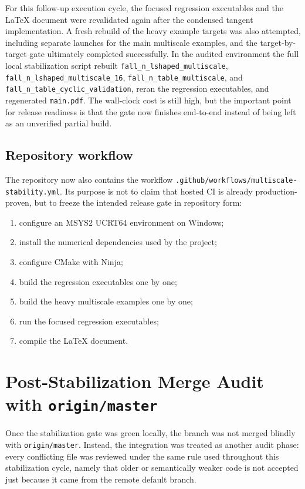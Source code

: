 For this follow-up execution cycle, the focused regression executables and the
\LaTeX{} document were revalidated again after the condensed tangent
implementation.  A fresh rebuild of the heavy example targets was also
attempted, including separate launches for the main multiscale examples, and
the target-by-target gate ultimately completed successfully.  In the audited
environment the full local stabilization script rebuilt
\texttt{fall\_n\_lshaped\_multiscale},
\texttt{fall\_n\_lshaped\_multiscale\_16},
\texttt{fall\_n\_table\_multiscale}, and
\texttt{fall\_n\_table\_cyclic\_validation}, reran the regression executables,
and regenerated \texttt{main.pdf}.  The wall-clock cost is still high, but the
important point for release readiness is that the gate now finishes end-to-end
instead of being left as an unverified partial build.

\subsection{Repository workflow}

The repository now also contains the workflow
\texttt{.github/workflows/multiscale-stability.yml}.  Its purpose is not to
claim that hosted CI is already production-proven, but to freeze the intended
release gate in repository form:
\begin{enumerate}
  \item configure an MSYS2 UCRT64 environment on Windows;
  \item install the numerical dependencies used by the project;
  \item configure CMake with Ninja;
  \item build the regression executables one by one;
  \item build the heavy multiscale examples one by one;
  \item run the focused regression executables;
  \item compile the \LaTeX{} document.
\end{enumerate}

\section{Post-Stabilization Merge Audit with \texttt{origin/master}}
\label{sec:ms-stab-merge-audit}

Once the stabilization gate was green locally, the branch was not merged
blindly with \texttt{origin/master}.  Instead, the integration was treated as
another audit phase: every conflicting file was reviewed under the same rule
used throughout this stabilization cycle, namely that older or semantically
weaker code is not accepted just because it came from the remote default
branch.

